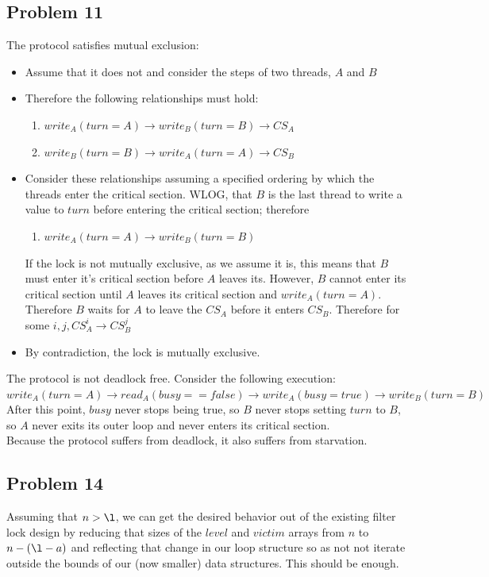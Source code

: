\documentclass[]{article}
\begin{document}
\subsection{Problem 11}
The protocol satisfies mutual exclusion:
\begin{itemize}
	\item Assume that it does not and consider the steps of two threads, $A$ and $B$
	\item Therefore the following relationships must hold:
	\begin{enumerate}
		\item $write_A(turn = A) \rightarrow write_B(turn = B) \rightarrow CS_A$
		\item $write_B(turn = B) \rightarrow write_A(turn = A) \rightarrow CS_B$
	\end{enumerate}
	\item Consider these relationships assuming a specified ordering by which the threads enter the critical section. WLOG,  that $B$ is the last thread to write a value to $turn$ before entering the critical section; therefore
	\begin{enumerate}
		\item $write_A(turn = A) \rightarrow write_B(turn = B)$
	\end{enumerate}
	If the lock is not mutually exclusive, as we assume it is, this means that $B$ must enter it's critical section before $A$ leaves its. However, $B$ cannot enter its critical section until $A$ leaves its critical section and $write_A(turn = A)$. Therefore $B$ waits for $A$ to leave the $CS_A$ before it enters $CS_B$. Therefore for some $i, j, CS_A^i \rightarrow CS_B^j$
	\item By contradiction, the lock is mutually exclusive.
\end{itemize}
The protocol is not deadlock free. Consider the following execution:
\\
	$write_A(turn = A) \rightarrow read_A(busy == false) \rightarrow write_A(busy = true)\rightarrow write_B(turn = B)$
\\
After this point, $busy$ never stops being true, so $B$ never stops setting $turn$ to $B$, so $A$ never exits its outer loop and never enters its critical section.
\\
Because the protocol suffers from deadlock, it also suffers from starvation.
\subsection{Problem 14}
Assuming that $n > \l$, we can get the desired behavior out of the existing filter lock design by reducing that sizes of the $level$ and $victim$ arrays from $n$ to $n - (\l - a)$ and reflecting that change in our loop structure so as not not iterate outside the bounds of our (now smaller) data structures. This should be enough.
\end{document}
